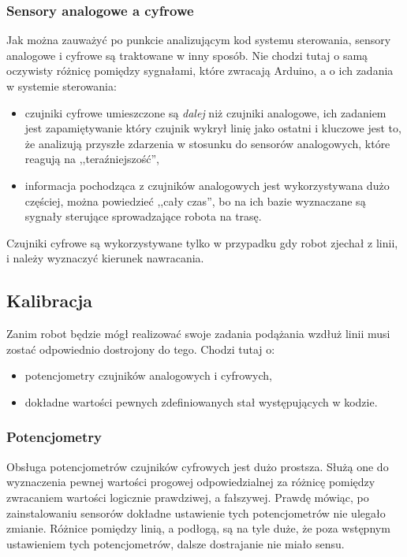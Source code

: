 \documentclass[11pt]{article}
\begin{document}
\subsubsection{Sensory analogowe a cyfrowe}

Jak można zauważyć po punkcie analizującym kod systemu sterowania, sensory analogowe i cyfrowe są traktowane w inny sposób. Nie chodzi tutaj o samą oczywisty różnicę pomiędzy sygnałami, które zwracają Arduino, a o ich zadania w systemie sterowania:
\begin{itemize}
\item czujniki cyfrowe umieszczone są \emph{dalej} niż czujniki analogowe, ich zadaniem jest zapamiętywanie który czujnik wykrył linię jako ostatni i kluczowe jest to, że analizują przyszłe zdarzenia w stosunku do sensorów analogowych, które reagują na ,,teraźniejszość'',
\item informacja pochodząca z czujników analogowych jest wykorzystywana dużo częściej, można powiedzieć ,,cały czas'', bo na ich bazie wyznaczane są sygnały sterujące sprowadzające robota na trasę.
\end{itemize}

Czujniki cyfrowe są wykorzystywane tylko w przypadku gdy robot zjechał z linii, i należy wyznaczyć kierunek nawracania.

\subsection{Kalibracja}

Zanim robot będzie mógł realizować swoje zadania podążania wzdłuż linii musi zostać odpowiednio dostrojony do tego. Chodzi tutaj o:
\begin{itemize}
\item potencjometry czujników analogowych i cyfrowych,
\item dokładne wartości pewnych zdefiniowanych stał występujących w kodzie.
\end{itemize}

\subsubsection{Potencjometry}

Obsługa potencjometrów czujników cyfrowych jest dużo prostsza. Służą one do wyznaczenia pewnej wartości progowej odpowiedzialnej za różnicę pomiędzy zwracaniem wartości logicznie prawdziwej, a fałszywej. Prawdę mówiąc, po zainstalowaniu sensorów dokładne ustawienie tych potencjometrów nie ulegało zmianie. Różnice pomiędzy linią, a podłogą, są na tyle duże, że poza wstępnym ustawieniem tych potencjometrów, dalsze dostrajanie nie miało sensu.
\end{document}
